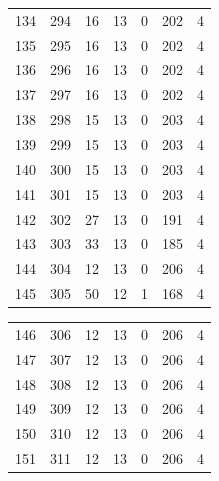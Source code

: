 \documentclass[a4paper,twoside,12pt]{book}
\begin{document}
\begin{appendices}
\begin{table}
\begin{tabular}{lrrrrrr}
		134 &    294 &        16 &        13 &               0 &             202 &         4 \\
		135 &    295 &        16 &        13 &               0 &             202 &         4 \\
		136 &    296 &        16 &        13 &               0 &             202 &         4 \\
		137 &    297 &        16 &        13 &               0 &             202 &         4 \\
		138 &    298 &        15 &        13 &               0 &             203 &         4 \\
		139 &    299 &        15 &        13 &               0 &             203 &         4 \\
		140 &    300 &        15 &        13 &               0 &             203 &         4 \\
		141 &    301 &        15 &        13 &               0 &             203 &         4 \\
		142 &    302 &        27 &        13 &               0 &             191 &         4 \\
		143 &    303 &        33 &        13 &               0 &             185 &         4 \\
		144 &    304 &        12 &        13 &               0 &             206 &         4 \\
		145 &    305 &        50 &        12 &               1 &             168 &         4 \\
		\bottomrule
	\end{tabular}		
\end{table}
\begin{table}
	\centering
	\begin{tabular}{lrrrrrr}
		\toprule
		146 &    306 &        12 &        13 &               0 &             206 &         4 \\
		147 &    307 &        12 &        13 &               0 &             206 &         4 \\
		148 &    308 &        12 &        13 &               0 &             206 &         4 \\
		149 &    309 &        12 &        13 &               0 &             206 &         4 \\
		150 &    310 &        12 &        13 &               0 &             206 &         4 \\
		151 &    311 &        12 &        13 &               0 &             206 &         4 \\

\end{tabular}
\end{table}
\end{appendices}
\end{document}

